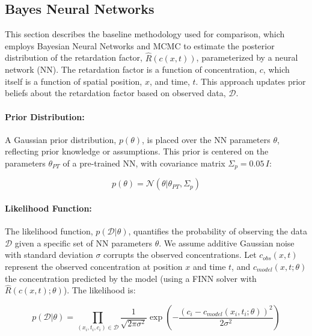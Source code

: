 \subsection{Bayes Neural Networks}
\label{sec:bayes_nn}
This section describes the baseline methodology used for comparison, which employs Bayesian Neural Networks and MCMC to estimate the posterior distribution of the retardation factor, $\hat{R}(c(x,t))$, parameterized by a neural network (NN). The retardation factor is a function of concentration, $c$, which itself is a function of spatial position, $x$, and time, $t$. This approach updates prior beliefs about the retardation factor based on observed data, $\mathcal{D}$.

\paragraph{Prior Distribution:}

A Gaussian prior distribution, $p(\theta)$, is placed over the NN parameters $\theta$, reflecting prior knowledge or assumptions. This prior is centered on the parameters $\theta_{PT}$ of a pre-trained NN, with covariance matrix $\Sigma_p = 0.05 \, I$:


\begin{equation*}
p(\theta) = \mathcal{N}(\theta | \theta_{PT}, \Sigma_p)
\end{equation*}

\paragraph{Likelihood Function:}

The likelihood function, $p(\mathcal{D} | \theta)$, quantifies the probability of observing the data $\mathcal{D}$ given a specific set of NN parameters $\theta$. We assume additive Gaussian noise with standard deviation $\sigma$ corrupts the observed concentrations. Let $c_{obs}(x,t)$ represent the observed concentration at position $x$ and time $t$, and $c_{model}(x,t; \theta)$ the concentration predicted by the model (using a FINN solver with $\hat{R}(c(x,t);\theta)$). The likelihood is:

\begin{equation}
p(\mathcal{D} | \theta) = \prod_{(x_i, t_i, c_i) \in \mathcal{D}} \frac{1}{\sqrt{2\pi \sigma^2}} \exp \left( -\frac{(c_i - c_{model}(x_i, t_i; \theta))^2}{2\sigma^2} \right)
\label{eq:likelihood}
\end{equation}

